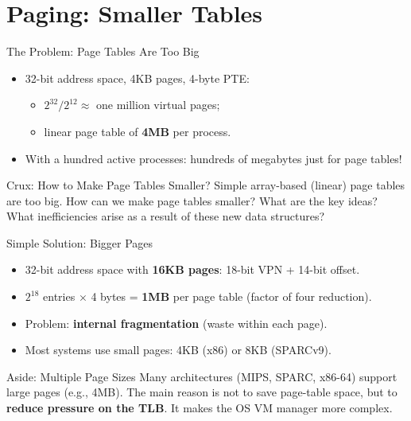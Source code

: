 \section{Paging: Smaller Tables}

\begin{frame}{The Problem: Page Tables Are Too Big}

\begin{itemize}
    \item 32-bit address space, 4KB pages, 4-byte PTE:
    \begin{itemize}
        \item $2^{32}/2^{12} \approx$ one million virtual pages;
        \item linear page table of \textbf{4MB} per process.
    \end{itemize}
    \item With a hundred active processes: hundreds of megabytes
          just for page tables!
\end{itemize}

\begin{block}{Crux: How to Make Page Tables Smaller?}
Simple array-based (linear) page tables are too big. How can we make page
tables smaller? What are the key ideas? What inefficiencies arise as a
result of these new data structures?
\end{block}

\end{frame}

\begin{frame}{Simple Solution: Bigger Pages}

\begin{itemize}
    \item 32-bit address space with \textbf{16KB pages}:
          18-bit VPN + 14-bit offset.
    \item $2^{18}$ entries $\times$ 4 bytes = \textbf{1MB} per page table
          (factor of four reduction).
    \item Problem: \textbf{internal fragmentation} (waste within each page).
    \item Most systems use small pages: 4KB (x86) or 8KB (SPARCv9).
\end{itemize}

\begin{block}{Aside: Multiple Page Sizes}
Many architectures (MIPS, SPARC, x86-64) support large pages (e.g., 4MB).
The main reason is not to save page-table space, but to
\textbf{reduce pressure on the TLB}. It makes the OS VM manager more complex.
\end{block}

\end{frame}

